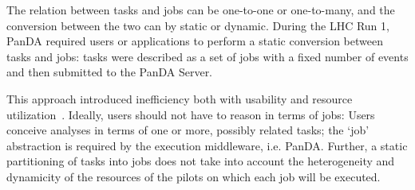 





The relation between tasks and jobs can be one-to-one or one-to-many, and the
conversion between the two can by static or dynamic. During the LHC Run 1, PanDA
required users or applications to perform a static conversion between tasks and
jobs: tasks were described as a set of jobs with a fixed number of events and
then submitted to the PanDA Server.

This approach introduced inefficiency both with usability and resource
utilization~\cite{borodin2015unified}. Ideally, users should not have to reason
in terms of jobs: Users conceive analyses in terms of one or more, possibly
related tasks; the `job' abstraction is required by the execution middleware,
i.e. PanDA. Further, a static partitioning of tasks into jobs does not take into
account the heterogeneity and dynamicity of the resources of the pilots on which
each job will be executed.

